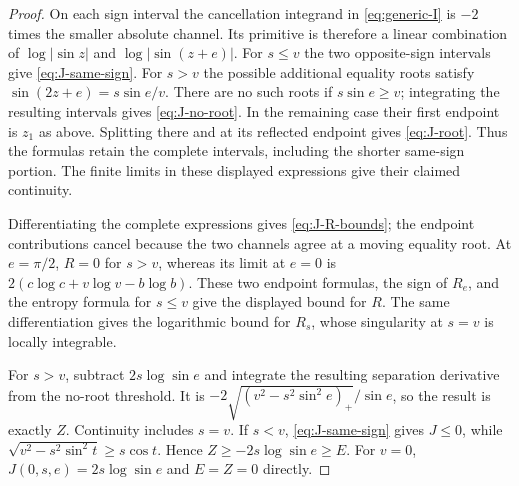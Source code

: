 \begin{proof}
On each sign interval the cancellation integrand in
\eqref{eq:generic-I} is $-2$ times the smaller absolute channel. Its
primitive is therefore a linear combination of $\log|\sin z|$ and
$\log|\sin(z+e)|$. For $s\leq v$ the two opposite-sign intervals give
\eqref{eq:J-same-sign}. For $s>v$ the possible additional equality
roots satisfy
$\sin(2z+e)=s\sin e/v$. There are no such roots if
$s\sin e\geq v$; integrating the resulting intervals gives
\eqref{eq:J-no-root}. In the remaining case their first endpoint is
$z_1$ as above. Splitting there and at its reflected endpoint gives
\eqref{eq:J-root}. Thus the formulas retain the complete intervals,
including the shorter same-sign portion. The finite limits in these
displayed expressions give their claimed continuity.

Differentiating the complete expressions gives \eqref{eq:J-R-bounds};
the endpoint contributions cancel because the two channels agree at a
moving equality root. At $e=\pi/2$, $R=0$ for $s>v$, whereas its limit
at $e=0$ is $2(c\log c+v\log v-b\log b)$. These two endpoint formulas,
the sign of $R_e$, and the entropy formula for $s\leq v$ give the
displayed bound for $R$. The same differentiation gives the logarithmic
bound for $R_s$, whose singularity at $s=v$ is locally integrable.

For $s>v$, subtract $2s\log\sin e$ and integrate the resulting
separation derivative from the no-root threshold. It is
$-2\sqrt{(v^2-s^2\sin^2e)_+}/\sin e$, so the result is exactly $Z$.
Continuity includes $s=v$. If $s<v$, \eqref{eq:J-same-sign} gives
$J\leq0$, while
$\sqrt{v^2-s^2\sin^2t}\geq s\cos t$. Hence
$Z\geq-2s\log\sin e\geq E$. For $v=0$,
$J(0,s,e)=2s\log\sin e$ and $E=Z=0$ directly.
\end{proof}

